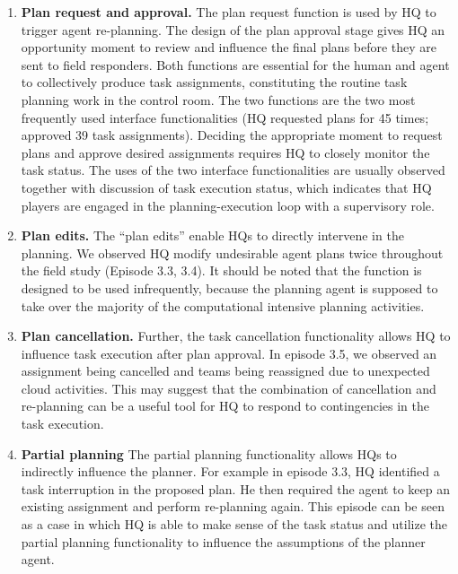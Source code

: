 \begin{enumerate}
\item \textbf{ Plan request and approval.} The plan request function is used by HQ to trigger agent re-planning. The design of the plan approval stage gives HQ an opportunity moment to review and influence the final plans before they are sent to field responders. Both functions are essential for the human and agent to collectively produce task assignments, constituting the routine task planning work in the control room. The two functions are the two most frequently used interface functionalities (HQ requested plans for 45 times; approved 39 task assignments). Deciding the appropriate moment to request plans and approve desired assignments requires HQ to closely monitor the task status. The uses of the two interface functionalities are usually observed together with discussion of task execution status, which indicates that HQ players are engaged in the planning-execution loop with a supervisory role. \\

\item \textbf{ Plan edits.} The ``plan edits'' enable HQs to directly intervene in the planning. We observed HQ modify undesirable agent plans twice throughout the field study (Episode 3.3, 3.4). It should be noted that the function is designed to be used infrequently, because the planning agent is supposed to take over the majority of the computational intensive planning activities. \\

\item \textbf{ Plan cancellation.} Further, the task cancellation functionality allows HQ to influence task execution after plan approval. In episode 3.5, we observed an assignment being cancelled and teams being reassigned due to unexpected cloud activities. This may suggest that the combination of cancellation and re-planning can be a useful tool for HQ to respond to contingencies in the task execution.\\

\item \textbf{ Partial planning } The partial planning functionality allows HQs to indirectly influence the planner. For example in episode 3.3, HQ identified a task interruption in the proposed plan. He then required the agent to keep an existing assignment and perform re-planning again.  This episode can be seen as a case in which HQ is able to make sense of the task status and utilize the partial planning functionality to influence the assumptions of the planner agent. \\

\end{enumerate}

